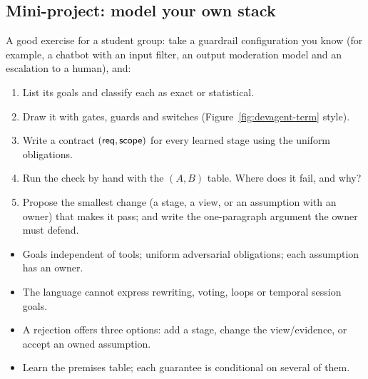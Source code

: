 \subsection{Mini-project: model your own stack}

A good exercise for a student group: take a guardrail configuration you know (for example, a chatbot with an input filter, an output moderation model and an escalation to a human), and:

\begin{enumerate}
\item List its goals and classify each as exact or statistical.
\item Draw it with gates, guards and switches (Figure~\ref{fig:devagent-term} style).
\item Write a contract $(\mathsf{req},\mathsf{scope})$ for every learned stage using the uniform obligations.
\item Run the check by hand with the $(A,B)$ table. Where does it fail, and why?
\item Propose the smallest change (a stage, a view, or an assumption with an owner) that makes it pass; and write the one-paragraph argument the owner must defend.
\end{enumerate}

\begin{recap}
\begin{itemize}
\item Goals independent of tools; uniform adversarial obligations; each assumption has an owner.
\item The language cannot express rewriting, voting, loops or temporal session goals.
\item A rejection offers three options: add a stage, change the view/evidence, or accept an owned assumption.
\item Learn the premises table; each guarantee is conditional on several of them.
\end{itemize}
\end{recap}

